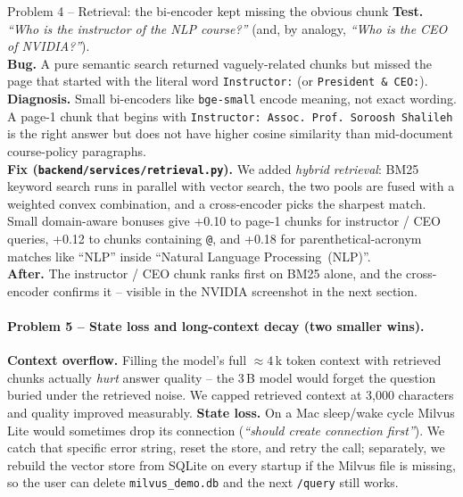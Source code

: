 \documentclass[11pt,a4paper]{article}
\begin{document}
\begin{problembox}{Problem 4 -- Retrieval: the bi-encoder kept missing the obvious chunk}
\textbf{Test.}
\textit{``Who is the instructor of the NLP course?''} (and, by analogy,
\textit{``Who is the CEO of NVIDIA?''}).\\[2pt]
\textbf{Bug.}
A pure semantic search returned vaguely-related chunks but missed the page
that started with the literal word \texttt{Instructor:} (or
\texttt{President\,\&\,CEO:}).\\[2pt]
\textbf{Diagnosis.}
Small bi-encoders like \texttt{bge-small} encode meaning, not exact
wording. A page-1 chunk that begins with \texttt{Instructor: Assoc.\ Prof.
Soroosh Shalileh} is the right answer but does not have higher cosine
similarity than mid-document course-policy paragraphs.\\[2pt]
\textbf{Fix (\texttt{backend/services/retrieval.py}).}
We added \emph{hybrid retrieval}: BM25 keyword search runs in parallel
with vector search, the two pools are fused with a weighted convex
combination, and a cross-encoder picks the sharpest match. Small
domain-aware bonuses give +0.10 to page-1 chunks for instructor / CEO
queries, +0.12 to chunks containing \texttt{@}, and +0.18 for
parenthetical-acronym matches like ``NLP'' inside
``Natural Language Processing~(NLP)''.\\[2pt]
\textbf{After.}
The instructor / CEO chunk ranks first on BM25 alone, and the
cross-encoder confirms it -- visible in the NVIDIA screenshot in the
next section.
\end{problembox}

\paragraph{Problem 5 -- State loss and long-context decay (two smaller wins).}
\textbf{Context overflow.} Filling the model's full $\approx\!4$\,k token
context with retrieved chunks actually \emph{hurt} answer quality -- the
3\,B model would forget the question buried under the retrieved noise. We
capped retrieved context at 3{,}000 characters and quality improved
measurably.
\textbf{State loss.} On a Mac sleep/wake cycle Milvus Lite would sometimes
drop its connection (\textit{``should create connection first''}). We
catch that specific error string, reset the store, and retry the call;
separately, we rebuild the vector store from SQLite on every startup if
the Milvus file is missing, so the user can delete
\texttt{milvus\_demo.db} and the next \texttt{/query} still works.
\end{document}
